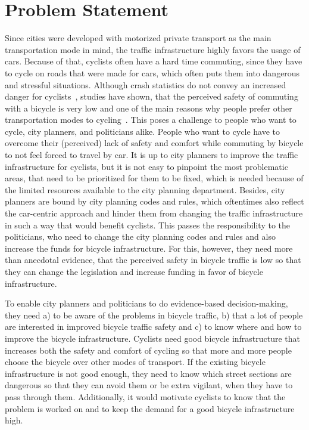 \section{Problem Statement}
\label{sec:problem}
Since cities were developed with motorized private transport as the main transportation mode in mind, the traffic infrastructure highly favors the usage of cars.
Because of that, cyclists often have a hard time commuting, since they have to cycle on roads that were made for cars, which often puts them into dangerous and stressful situations.
Although crash statistics do not convey an increased danger for cyclists~\cite{juhra2012bicycle}, studies have shown, that the perceived safety of commuting with a bicycle is very low and one of the main reasons why people prefer other transportation modes to cycling~\cite{horton2016fear}.
This poses a challenge to people who want to cycle, city planners, and politicians alike.
People who want to cycle have to overcome their (perceived) lack of safety and comfort while commuting by bicycle to not feel forced to travel by car. 
It is up to city planners to improve the traffic infrastructure for cyclists, but it is not easy to pinpoint the most problematic areas, that need to be prioritized for them to be fixed, which is needed because of the limited resources available to the city planning department.
Besides, city planners are bound by city planning codes and rules, which oftentimes also reflect the car-centric approach and hinder them from changing the traffic infrastructure in such a way that would benefit cyclists.
This passes the responsibility to the politicians, who need to change the city planning codes and rules and also increase the funds for bicycle infrastructure.
For this, however, they need more than anecdotal evidence, that the perceived safety in bicycle traffic is low so that they can change the legislation and increase funding in favor of bicycle infrastructure.

To enable city planners and politicians to do evidence-based decision-making, they need a) to be aware of the problems in bicycle traffic, b) that a lot of people are interested in improved bicycle traffic safety and c) to know where and how to improve the bicycle infrastructure.
Cyclists need good bicycle infrastructure that increases both the safety and comfort of cycling so that more and more people choose the bicycle over other modes of transport.
If the existing bicycle infrastructure is not good enough, they need to know which street sections are dangerous so that they can avoid them or be extra vigilant, when they have to pass through them.
Additionally, it would motivate cyclists to know that the problem is worked on and to keep the demand for a good bicycle infrastructure high. 

